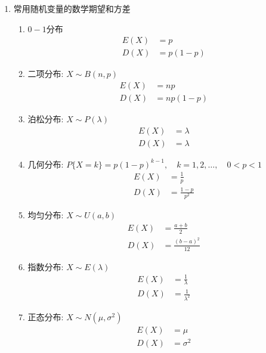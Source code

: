 \begin{enumerate}
	\item 常用随机变量的数学期望和方差
	\begin{enumerate}
		\item $0-1$分布
		\begin{align}
			E(X) &= p \\
			D(X) &= p(1-p)
		\end{align}
		\item 二项分布: $X \sim B(n,p)$
		\begin{align}
			E(X) &= np \\
			D(X) &= np(1-p)
		\end{align}
		\item 泊松分布: $X \sim P(\lambda)$
		\begin{align}
			E(X) &= \lambda \\
			D(X) &= \lambda
		\end{align}
		\item 几何分布: $P\{X=k\} = p(1-p)^{k-1}, \quad k = 1, 2, \dots, \quad 0<p<1$
		\begin{align}
			E(X) &= \frac{1}{p} \\
			D(X) &= \frac{1-p}{p^2}
		\end{align}
		\item 均匀分布: $X \sim U(a,b)$
		\begin{align}
			E(X) &= \frac{a+b}{2} \\
			D(X) &= \frac{(b-a)^2}{12}
		\end{align}
		\item 指数分布: $X \sim E(\lambda)$
		\begin{align}
			E(X) &= \frac{1}{\lambda} \\
			D(X) &= \frac{1}{\lambda^2}
		\end{align}
		\item 正态分布: $X \sim N(\mu, \sigma^2)$
		\begin{align}
			E(X) &= \mu \\
			D(X) &= \sigma^2
		\end{align}
	\end{enumerate}
\end{enumerate}




















